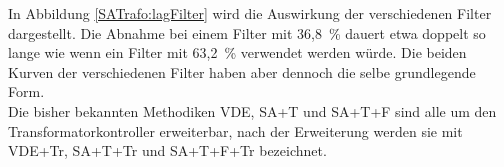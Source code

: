 In Abbildung \ref{SATrafo:lagFilter} wird die Auswirkung der verschiedenen Filter dargestellt. Die Abnahme bei einem Filter mit 36,8~\% dauert etwa doppelt so lange wie wenn ein Filter mit 63,2~\% verwendet werden würde. Die beiden Kurven der verschiedenen Filter haben aber dennoch die selbe grundlegende Form.\\
Die bisher bekannten Methodiken VDE, SA+T und SA+T+F sind alle um den Transformatorkontroller erweiterbar, nach der Erweiterung werden sie mit VDE+Tr, SA+T+Tr und SA+T+F+Tr bezeichnet.
